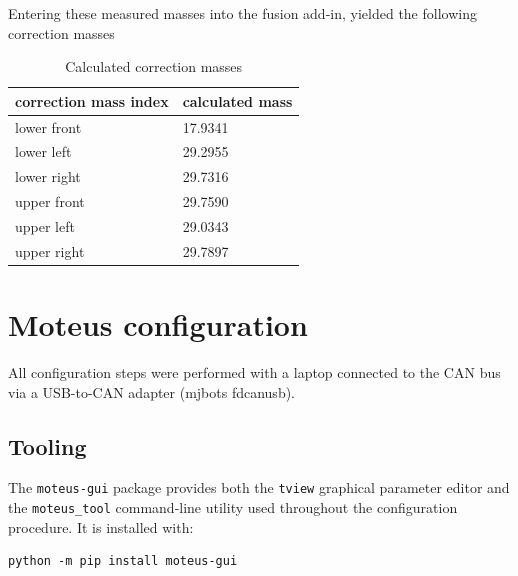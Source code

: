 Entering these measured masses into the fusion add-in, yielded the following correction masses
\begin{table}
	\caption{Calculated correction masses}\label{tab:correction-masses}
	\begin{center}
		\begin{tabular}[c]{l|l}
			\hline
			\multicolumn{1}{c|}{\textbf{correction mass index}} &
			\multicolumn{1}{c}{\textbf{calculated mass}}                  \\
			\hline
			lower front                                         & 17.9341 \\
			lower left                                          & 29.2955 \\
			lower right                                         & 29.7316 \\
			upper front                                         & 29.7590 \\
			upper left                                          & 29.0343 \\
			upper right                                         & 29.7897 \\
			\hline
		\end{tabular}
	\end{center}
\end{table}




\clearpage
\section{Moteus configuration}
\label{sec:moteus-config}

All configuration steps were performed with a laptop connected to the CAN bus via a
USB-to-CAN adapter (mjbots fdcanusb).

\subsection{Tooling}

The \texttt{moteus-gui} package provides both the \texttt{tview} graphical parameter editor
and the \texttt{moteus\_tool} command-line utility used throughout the configuration procedure.
It is installed with:

\begin{listing}[H]
	\begin{verbatim}
python -m pip install moteus-gui
\end{verbatim}
	\caption{Installing the moteus Python tooling.}
	\label{lst:moteus-install}
\end{listing}

